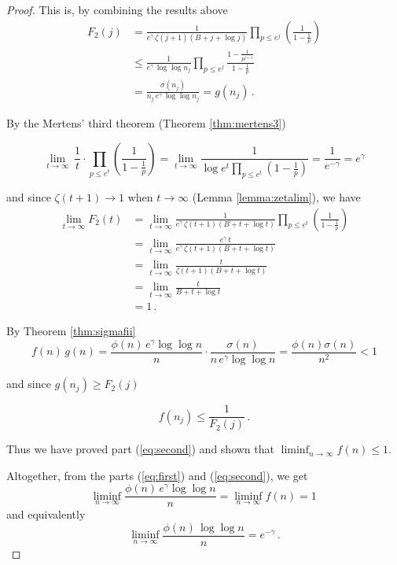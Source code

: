 \documentclass{article}
\begin{document}
\begin{theorem}
\begin{proof}
This is, by combining the results above
\begin{align*}
    F_2(j)& = \frac{1}{e^\gamma\,\zeta(j+1)(B+j+\log j)} \prod_{p\leq e^j} \left(\frac{1}{1-\frac{1}{p}}\right)\\
    & \leq \frac{1}{e^\gamma\,\log \log n_j} \prod_{p\leq e^j} \frac{1-\frac{1}{p^{j+1}}}{1-\frac{1}{p}}\\
    & = \frac{\sigma(n_j)}{n_j\,e^\gamma\,\log \log n_j} = g(n_j)\,.
\end{align*}

By the Mertens' third theorem (Theorem \ref{thm:mertens3})

\begin{equation*}
    \lim_{t \rightarrow \infty}\, \frac{1}{t} \cdot \prod_{p\leq e^t} \left(\frac{1}{1-\frac{1}{p}}\right) = \lim_{t \rightarrow \infty} \frac{1}{\log e^t\prod_{p\leq e^t} \left(1-\frac{1}{p}\right)} = \frac{1}{e^{-\gamma}} = e^\gamma
\end{equation*}

and since $\zeta(t+1)\rightarrow 1$ when $t\rightarrow\infty$ (Lemma \ref{lemma:zetalim}), we have
\begin{align*}
    \lim_{t \rightarrow \infty} F_2(t) & = \lim_{t \rightarrow \infty} \frac{1}{e^\gamma\,\zeta(t+1)(B+t+\log t)} \prod_{p\leq e^t} \left(\frac{1}{1-\frac{1}{p}}\right)\\
    & = \lim_{t \rightarrow \infty} \frac{e^\gamma\,t}{e^\gamma\,\zeta(t+1)(B+t+\log t)}\\
    & = \lim_{t \rightarrow \infty} \frac{t}{\zeta(t+1)(B+t+\log t)}\\
    & = \lim_{t \rightarrow \infty} \frac{t}{B+t+\log t}\\
    & = 1\,.
\end{align*}

By Theorem \ref{thm:sigmafii}
\begin{equation*}
    f(n)\,g(n) = \frac{\phi(n)\,e^\gamma \log\log n}{n} \cdot \frac{\sigma(n)}{n\,e^\gamma \log\log n} = \frac{\phi(n)\sigma(n)}{n^2}<1
\end{equation*}

and since $g(n_j) \geq F_2(j)$

\begin{equation*}
    f(n_j)\leq \frac{1}{F_2(j)}\,.
\end{equation*}

Thus we have proved part (\ref{eq:second}) and shown that $\liminf_{n \rightarrow \infty}{f(n)\leq 1}$.

Altogether, from the parts (\ref{eq:first}) and (\ref{eq:second}), we get
\begin{equation*}
    \liminf_{n \rightarrow \infty}{\frac{\phi(n)\,e^\gamma \log\log n}{n}}=\liminf_{n \rightarrow \infty}{f(n)}=1\,
\end{equation*}
and equivalently
\begin{equation*}
    \liminf_{n \rightarrow \infty}{\frac{\phi(n)\,\log\log n}{n}}=e^{-\gamma}\,.
\end{equation*}
\end{proof}
\end{theorem}
\end{document}
